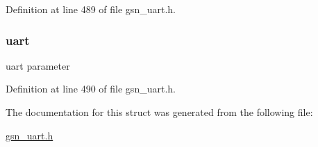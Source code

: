Definition at line 489 of file gsn\_\-uart.h.

\hypertarget{a00266_aa86d9ef5b100af213cec79346dc9ce74}{
\subsubsection[{uart}]{ {\bf uart}}}
\label{a00266_aa86d9ef5b100af213cec79346dc9ce74}
uart parameter 

Definition at line 490 of file gsn\_\-uart.h.



The documentation for this struct was generated from the following file:\begin{DoxyCompactItemize}
\item 
\hyperlink{a00600}{gsn\_\-uart.h}\end{DoxyCompactItemize}
